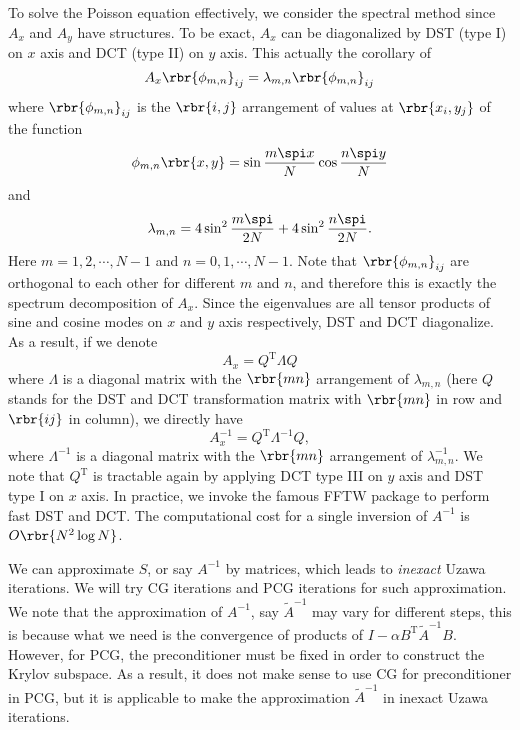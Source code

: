 \documentclass[english, nochinese]{pnote}
\begin{document}
To solve the Poisson equation effectively, we consider the spectral method since $A_x$ and $A_y$ have structures. To be exact, $A_x$ can be diagonalized by DST (type I) on $x$ axis and DCT (type II) on $y$ axis. This actually the corollary of
\begin{equation}
A_x \rbr{\phi_{ m, n }}_{ i j } = \lambda_{ m, n } \rbr{\phi_{ m, n }}_{ i j }
\end{equation}
where $ \rbr{\phi_{ m, n }}_{ i j } $ is the $ \rbr{ i, j } $ arrangement of values at $ \rbr{ x_i, y_j } $ of the function
\begin{equation}
\phi_{ m, n } \rbr{ x, y } = \sin \frac{ m \spi x }{N} \cos \frac{ n \spi y }{N}
\end{equation}
and
\begin{equation}
\lambda_{ m, n } = 4 \sin^2 \frac{ m \spi }{ 2 N } + 4 \sin^2 \frac{ n \spi }{ 2 N }.
\end{equation}
Here $ m = 1, 2, \cdots, N - 1 $ and $ n = 0, 1, \cdots, N - 1 $. Note that $ \rbr{\phi_{ m, n }}_{ i j } $ are orthogonal to each other for different $m$ and $n$, and therefore this is exactly the spectrum decomposition of $A_x$. Since the eigenvalues are all tensor products of sine and cosine modes on $x$ and $y$ axis respectively, DST and DCT diagonalize. As a result, if we denote
\begin{equation}
A_x = Q^{\text{T}} \Lambda Q
\end{equation}
where $\Lambda$ is a diagonal matrix with the $ \rbr{ m n } $ arrangement of $ \lambda_{ m, n } $ (here $Q$ stands for the DST and DCT transformation matrix with $ \rbr{ m n } $ in row and $ \rbr{ i j } $ in column), we directly have
\begin{equation}
A_x^{-1} = Q^{\text{T}} \Lambda^{-1} Q,
\end{equation}
where $\Lambda^{-1} $ is a diagonal matrix with the $ \rbr{ m n } $ arrangement of $ \lambda_{ m, n }^{-1} $. We note that $Q^{\text{T}}$ is tractable again by applying DCT type III on $y$ axis and DST type I on $x$ axis. In practice, we invoke the famous FFTW package to perform fast DST and DCT. The computational cost for a single inversion of $A^{-1}$ is $ O \rbr{ N^2 \log N } $.

We can approximate $S$, or say $A^{-1}$ by matrices, which leads to \emph{inexact} Uzawa iterations. We will try CG iterations and PCG iterations for such approximation. We note that the approximation of $A^{-1}$, say $\tilde{A}^{-1}$ may vary for different steps, this is because what we need is the convergence of products of $ I - \alpha B^{\text{T}} \tilde{A}^{-1} B $. However, for PCG, the preconditioner must be fixed in order to construct the Krylov subspace. As a result, it does not make sense to use CG for preconditioner in PCG, but it is applicable to make the approximation $\tilde{A}^{-1}$ in inexact Uzawa iterations.
\end{document}
